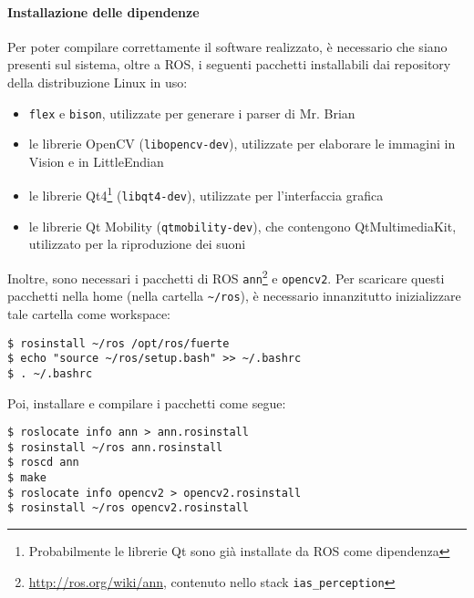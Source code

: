 \paragraph{Installazione delle dipendenze} Per poter compilare correttamente il software realizzato, è necessario che siano presenti sul sistema, oltre a ROS, i seguenti pacchetti installabili dai repository della distribuzione Linux in uso:
\begin{itemize}
\item \verb|flex| e \verb|bison|, utilizzate per generare i parser di Mr. Brian
\item le librerie OpenCV (\verb|libopencv-dev|), utilizzate per elaborare le immagini in Vision e in LittleEndian
\item le librerie Qt4\footnote{Probabilmente le librerie Qt sono già installate da ROS come dipendenza} (\verb|libqt4-dev|), utilizzate per l'interfaccia grafica
\item le librerie Qt Mobility (\verb|qtmobility-dev|), che contengono QtMultimediaKit, utilizzato per la riproduzione dei suoni
\end{itemize}
Inoltre, sono necessari i pacchetti di ROS \verb|ann|\footnote{\url{http://ros.org/wiki/ann}, contenuto nello stack \texttt{ias\_perception}} e \verb|opencv2|. Per scaricare questi pacchetti nella home (nella cartella \verb|~/ros|), è necessario innanzitutto inizializzare tale cartella come workspace:
\begin{verbatim}
$ rosinstall ~/ros /opt/ros/fuerte
$ echo "source ~/ros/setup.bash" >> ~/.bashrc
$ . ~/.bashrc
\end{verbatim}
Poi, installare e compilare i pacchetti come segue:
\begin{verbatim}
$ roslocate info ann > ann.rosinstall
$ rosinstall ~/ros ann.rosinstall
$ roscd ann
$ make
$ roslocate info opencv2 > opencv2.rosinstall
$ rosinstall ~/ros opencv2.rosinstall
\end{verbatim}
